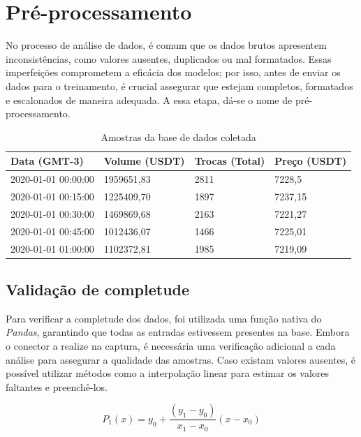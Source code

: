 \section{Pré-processamento} \label{sec:preprocessamento}
No processo de análise de dados, é comum que os dados brutos apresentem inconsistências, como valores ausentes, duplicados ou mal formatados. 
Essas imperfeições comprometem a eficácia dos modelos; por isso, antes de enviar os dados para o treinamento, é crucial assegurar que estejam completos, formatados e escalonados de maneira adequada.
A essa etapa, dá-se o nome de pré-processamento.

\begin{table}[!htb]
    \caption{Amostras da base de dados coletada} \label{tab:amostras}
    \begin{tabularx}{\textwidth}{X|X|X|X}
    \hline
    Data (GMT-3) & Volume (USDT) & Trocas (Total) & Preço (USDT) \\ \hline
    2020-01-01 00:00:00   & 1959651,83      & 2811            & 7228,5         \\ \hline
    2020-01-01 00:15:00   & 1225409,70      & 1897            & 7237,15        \\ \hline
    2020-01-01 00:30:00   & 1469869,68      & 2163            & 7221,27        \\ \hline
    2020-01-01 00:45:00   & 1012436,07      & 1466            & 7225,01        \\ \hline
    2020-01-01 01:00:00   & 1102372,81      & 1985            & 7219,09        \\ \hline
    \end{tabularx}
\end{table}

\subsection{Validação de completude} \label{sec:completude}
Para verificar a completude dos dados, foi utilizada uma função nativa do \textit{Pandas}, garantindo que todas as entradas estivessem presentes na base.
Embora o conector a realize na captura, é necessária uma verificação adicional a cada análise para assegurar a qualidade das amostras. 
Caso existam valores ausentes, é possível utilizar métodos como a interpolação linear para estimar os valores faltantes e preenchê-los.

\begin{equation} 
    {P_1(x) = y_0 + \frac{(y_1 - y_0)}{x_1 - x_0} (x - x_0)}
    \label{eq:interpolacao} 
\end{equation}

